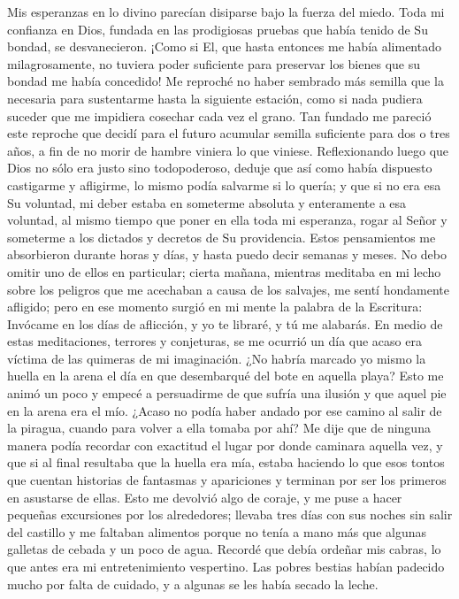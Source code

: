 \documentclass{novela}
\begin{document}
    Mis esperanzas en lo divino parecían disiparse bajo la fuerza del miedo. Toda mi confianza en Dios, fundada en las prodigiosas pruebas que había tenido de Su bondad, se desvanecieron. ¡Como si El, que hasta entonces me había alimentado milagrosamente, no tuviera poder suficiente para preservar los bienes que su bondad me había concedido!
    Me reproché no haber sembrado más semilla que la necesaria para sustentarme hasta la siguiente estación, como si nada pudiera suceder que me impidiera cosechar cada vez el grano. Tan fundado me pareció este reproche que decidí para el futuro acumular semilla suficiente para dos o tres años, a fin de no morir de hambre viniera lo que viniese.
    Reflexionando luego que Dios no sólo era justo sino todopoderoso, deduje que así como había dispuesto castigarme y afligirme, lo mismo podía salvarme si lo quería; y que si no era esa Su voluntad, mi deber estaba en someterme absoluta y enteramente a esa voluntad, al mismo tiempo que poner en ella toda mi esperanza, rogar al Señor y someterme a los dictados y decretos de Su providencia.
    Estos pensamientos me absorbieron durante horas y días, y hasta puedo decir semanas y meses. No debo omitir uno de ellos en particular; cierta mañana, mientras meditaba en mi lecho sobre los peligros que me acechaban a causa de los salvajes, me sentí hondamente afligido; pero en ese momento surgió en mi mente la palabra de la Escritura: Invócame en los días de aflicción, y yo te libraré, y tú me alabarás.
    En medio de estas meditaciones, terrores y conjeturas, se me ocurrió un día que acaso era víctima de las quimeras de mi imaginación. ¿No habría marcado yo mismo la huella en la arena el día en que desembarqué del bote en aquella playa? Esto me animó un poco y empecé a persuadirme de que sufría una ilusión y que aquel pie en la arena era el mío. ¿Acaso no podía haber andado por ese camino al salir de la piragua, cuando para volver a ella tomaba por ahí? Me dije que de ninguna manera podía recordar con exactitud el lugar por donde caminara aquella vez, y que si al final resultaba que la huella era mía, estaba haciendo lo que esos tontos que cuentan historias de fantasmas y apariciones y terminan por ser los primeros en asustarse de ellas.
    Esto me devolvió algo de coraje, y me puse a hacer pequeñas excursiones por los alrededores; llevaba tres días con sus noches sin salir del castillo y me faltaban alimentos porque no tenía a mano más que algunas galletas de cebada y un poco de agua. Recordé que debía ordeñar mis cabras, lo que antes era mi entretenimiento vespertino. Las pobres bestias habían padecido mucho por falta de cuidado, y a algunas se les había secado la leche.
\end{document}
